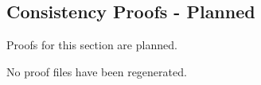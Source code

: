 \subsection*{Consistency Proofs - Planned}

\begin{remark*}
Proofs for this section are planned.
\end{remark*}

\begin{remark*}
No proof files have been regenerated.
\end{remark*}
